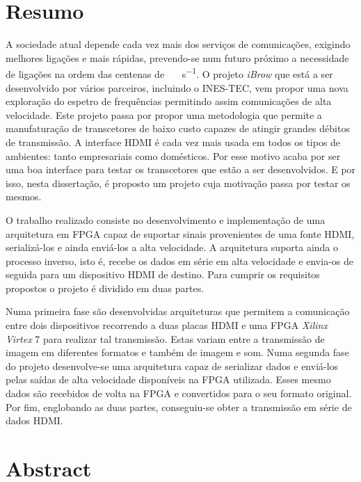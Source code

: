 \chapter*{Resumo}

A sociedade atual depende cada vez mais dos serviços de comunicações, exigindo melhores ligações e mais rápidas, prevendo-se num futuro próximo a necessidade de ligações na ordem das centenas de \SI{}{\giga\bit\per\second}. O projeto \textit{iBrow} que está a ser desenvolvido por vários parceiros, incluindo o INES-TEC, vem propor uma nova exploração do espetro de frequências permitindo assim comunicações de alta velocidade. Este projeto passa por propor uma metodologia que permite a manufaturação de transcetores de baixo custo capazes de atingir grandes débitos de transmissão. A interface HDMI é cada vez mais usada em todos os tipos de ambientes: tanto empresariais como domésticos. Por esse motivo acaba por ser uma boa interface para testar os transcetores que estão a ser desenvolvidos. E por isso, nesta dissertação, é proposto um projeto cuja motivação passa por testar os mesmos. 

O trabalho realizado consiste no desenvolvimento e implementação de  uma arquitetura em FPGA capaz de suportar sinais provenientes de uma fonte HDMI, serializá-los e ainda enviá-los a alta velocidade. A arquitetura suporta ainda o processo inverso, isto é, recebe os dados em série em alta velocidade e envia-os de seguida para um dispositivo HDMI de destino. Para cumprir os requisitos propostos o projeto é dividido em duas partes.

Numa primeira fase são desenvolvidas arquiteturas que permitem a comunicação entre dois dispositivos recorrendo a duas placas HDMI e uma FPGA \textit{Xilinx 	Virtex} 7 para realizar tal transmissão. Estas variam entre a transmissão de imagem em diferentes formatos e também de imagem e som. Numa segunda fase do projeto desenvolve-se uma arquitetura capaz de serializar dados e enviá-los pelas saídas de alta velocidade disponíveis na FPGA utilizada. Esses mesmo dados são recebidos de volta na FPGA e convertidos para o seu formato original. Por fim, englobando as duas partes, conseguiu-se obter a transmissão em série de dados HDMI.

\chapter*{Abstract}


